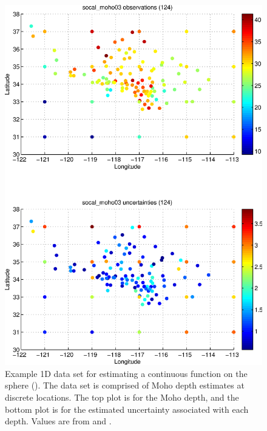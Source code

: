\documentclass[11pt,titlepage,fleqn]{article}
\begin{document}
\clearpage\pagebreak
\begin{figure}
\includegraphics[width=15cm]{fig1D_1.eps}
\caption[]
{{
Example 1D data set for estimating a continuous function on the sphere ().
The data set is comprised of Moho depth estimates at discrete locations.
The top plot is for the Moho depth, and the bottom plot is for the estimated uncertainty associated with each depth. Values are from \citet{YanClayton2007} and \citet{Crust2}.
\label{fig:1D_1}
}}
\end{figure}
\end{document}
